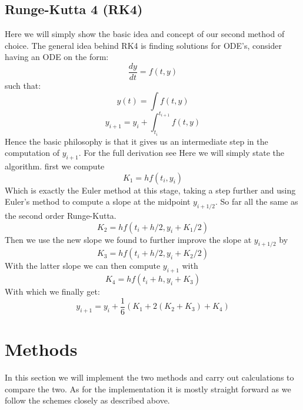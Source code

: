 \documentclass{article}
\begin{document}
\subsection{Runge-Kutta 4 (RK4)}
Here we will simply show the basic idea and concept of our second method of choice. The general idea behind RK4 is finding solutions for ODE's, consider having an ODE on the form:
$$\frac{dy}{dt} = f(t,y) $$ 
such that:
$$y(t) = \int f(t,y)$$
$$y_{i+1} = y_i + \int_{t_i}^{t_{i+1}} f(t,y)$$
Hence the basic philosophy is that it gives us an intermediate step in the computation of $y_{i+1}$. For the full derivation see \cite[p.~251]{compf}
Here we will simply state the algorithm. first we compute
$$K_1 = hf(t_i,y_i)$$
Which is exactly the Euler method at this stage, taking a step further and using Euler's method to compute a slope at the midpoint $y_{i+1/2}$. So far all the same as the second order Runge-Kutta.
$$K_2 = hf(t_i+h/2, y_i + K_1/2)$$
Then we use the new slope we found to further improve the slope at $y_{i+1/2}$ by
$$K_3 = hf(t_i + h/2, y_i + K_2/2)$$
With the latter slope we can then compute $y_{i+1}$ with
$$K_4 = hf(t_i + h, y_i + K_3)$$
With which we finally get:
$$y_{i+1} = y_i + \frac{1}{6}(K_1+2(K_2+K_3) + K_4)$$




\section{Methods}
In this section we will implement the two methods and carry out calculations to compare the two. As for the implementation it is mostly straight forward as we follow the schemes closely as described above.
\end{document}
